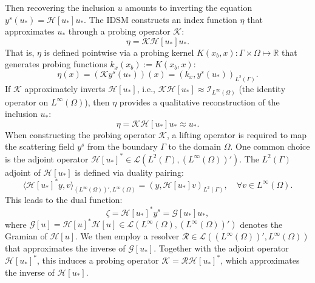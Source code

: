 \documentclass[onefignum,onetabnum]{siamart190516}
\numberwithin{equation}{section}
\begin{document}
Then recovering the inclusion $u$ amounts to inverting the equation $y^{s}(u_{*}) = \mathcal{H}[u_{*}]u_{*}$.
{The IDSM constructs an index function $\eta$ that approximates $u_{*}$ through a probing operator $\mathcal{K}$:
\begin{equation*}
\eta = \mathcal{K}\mathcal{H}[u_{*}]u_{*}.
\end{equation*}
That is, $\eta$ is defined pointwise via a probing kernel $K(x_b, x):\Gamma\times\Omega\mapsto\mathbb{R}$ that generates probing functions $k_x(x_b) := K(x_b, x)$:}
\begin{equation*}
\eta(x) = (\mathcal{K}y^{s}(u_{*}))(x) = (k_x, y^{s}(u_{*}))_{L^{2}(\Gamma)}.
\end{equation*}
If $\mathcal{K}$ approximately inverts $\mathcal{H}[u_{*}]$, i.e., $\mathcal{K}\mathcal{H}[u_{*}] \approx \mathcal{I}_{L^{\infty}(\Omega)}$ (the identity operator on $L^\infty(\Omega)$), then $\eta$ provides a qualitative reconstruction of the inclusion $u_{*}$:
\begin{equation*}
\eta = \mathcal{K}\mathcal{H}[u_{*}]u_{*} \approx u_{*}.
\end{equation*}
When constructing the probing operator $\mathcal{K}$, a lifting operator is required to map the scattering field $y^{s}$ from the boundary $\Gamma$ to the domain $\Omega$.
One common choice is the adjoint operator $\mathcal{H}[u_{*}]^{*} \in \mathcal{L}(L^{2}(\Gamma), (L^{\infty}(\Omega))')$.
The $L^{2}(\Gamma)$ adjoint of $\mathcal{H}[u_{*}]$ is defined via duality pairing:
$$\langle \mathcal{H}[u_{*}]^{*} y, v \rangle_{(L^{\infty}(\Omega))', L^{\infty}(\Omega)} = (y, \mathcal{H}[u_{*}]v)_{L^{2}(\Gamma)}, \quad\forall v \in L^{\infty}(\Omega).$$
This leads to the dual function:
\begin{equation}\label{eqn7}
\zeta = \mathcal{H}[u_{*}]^{*} y^{s} = \mathcal{G}[u_{*}]u_{*},
\end{equation}
where $\mathcal{G}[u] = \mathcal{H}[u]^{*}\mathcal{H}[u] \in \mathcal{L}(L^{\infty}(\Omega), (L^{\infty}(\Omega))')$ denotes the Gramian of $\mathcal{H}[u]$.
{
We then employ a resolver $\mathcal{R} \in \mathcal{L}((L^{\infty}(\Omega))', L^{\infty}(\Omega))$ that approximates the inverse of $\mathcal{G}[u_{*}]$.
Together with the adjoint operator $\mathcal{H}[u_{*}]^{*}$, this induces a probing operator $\mathcal{K} = \mathcal{R}\mathcal{H}[u_{*}]^{*}$, which approximates the inverse of $\mathcal{H}[u_{*}]$.
}
\end{document}
